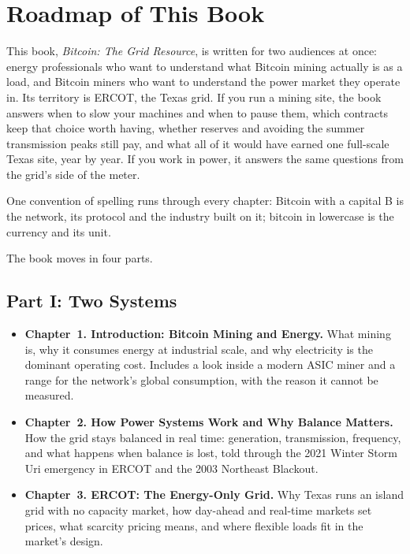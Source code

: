 \chapter*{Roadmap of This Book}

This book, \textit{Bitcoin: The Grid Resource}, is written for two audiences
at once: energy professionals who want to understand what Bitcoin mining
actually is as a load, and Bitcoin miners who want to understand the power
market they operate in. Its territory is ERCOT, the Texas grid. If you run a mining site, the book
answers when to slow your machines and when to pause them, which contracts
keep that choice worth having, whether reserves and avoiding the summer transmission
peaks still pay, and what all of it would have earned one full-scale Texas
site, year by year. If you work in power, it answers the same questions from
the grid's side of the meter.

One convention of spelling runs through every chapter: Bitcoin with a capital B is the network, its protocol and the industry built on it; bitcoin in lowercase is the currency and its unit.

The book moves in four parts.

\section*{Part I: Two Systems}

\begin{itemize}
\item \textbf{Chapter~1. Introduction: Bitcoin Mining and Energy.} What mining is, why
it consumes energy at industrial scale, and why electricity is the dominant
operating cost. Includes a look inside a modern ASIC miner and a
range for the network's global consumption, with the reason it cannot be
measured.

\item \textbf{Chapter~2. How Power Systems Work and Why Balance Matters.}
How the grid stays balanced in real time: generation, transmission,
frequency, and what happens when balance is lost, told through the 2021
Winter Storm Uri emergency in ERCOT and the 2003 Northeast Blackout.

\item \textbf{Chapter~3. ERCOT: The Energy-Only Grid.} Why Texas runs
an island grid with no capacity market, how day-ahead and real-time markets
set prices, what scarcity pricing means, and where flexible loads fit in
the market's design.
\end{itemize}

